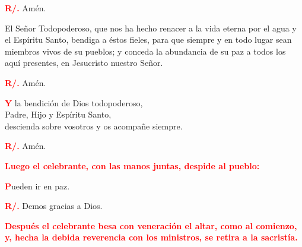 \documentclass[12pt, letterpaper]{report}
\begin{document}
\noindent
\Large {\bfseries \textcolor{red}{R/.}} \hspace{0.5cm} Am\'en.

\Large El Se\~nor Todopoderoso, que nos ha hecho renacer a la vida eterna por el agua y el Esp\'iritu Santo, bendiga a \'estos fieles, para que siempre y en todo lugar sean miembros vivos de su pueblos; y conceda la abundancia de su paz a todos los aqu\'i presentes, en Jesucristo nuestro Se\~nor.

\noindent
\Large {\bfseries \textcolor{red}{R/.}} \hspace{0.5cm} Am\'en.

\newpage

\lettrine[lines=1]{\bfseries \textcolor{red}{Y}}{} \Large la bendici\'on de Dios todopoderoso, \\
Padre, Hijo \Huge{\textcolor{red}{}} \Large y Esp\'iritu Santo, \\
descienda sobre vosotros y os acompa\~ne siempre.

\noindent
\Large {\bfseries \textcolor{red}{R/.}} \hspace{0.5cm} Am\'en.

\large{\bfseries \textcolor{red}{Luego el celebrante, con las manos juntas, despide al pueblo:}}

\lettrine[lines=1]{\bfseries \textcolor{red}{P}}{}\Large ueden ir en paz.

\noindent
\Large {\bfseries \textcolor{red}{R/.}} \hspace{0.5cm} Demos gracias a Dios.

\large{\bfseries \textcolor{red}{Despu\'es el celebrante besa con veneraci\'on el altar, como al comienzo, y, hecha la debida reverencia con los ministros, se retira a la sacrist\'ia.}}

\end{document}
